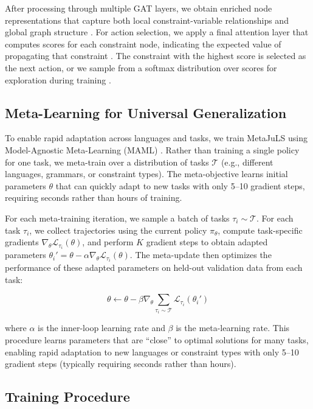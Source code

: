 \documentclass[11pt]{article}
\begin{document}
After processing through multiple GAT layers, we obtain enriched node representations that capture both local constraint-variable relationships and global graph structure \citep{hamilton2017inductive,perozzi2014deepwalk}. For action selection, we apply a final attention layer that computes scores for each constraint node, indicating the expected value of propagating that constraint \citep{vaswani2017attention}. The constraint with the highest score is selected as the next action, or we sample from a softmax distribution over scores for exploration during training \citep{schulman2017proximal}.

\subsection{Meta-Learning for Universal Generalization}

To enable rapid adaptation across languages and tasks, we train MetaJuLS using Model-Agnostic Meta-Learning (MAML) \citep{finn2017model}. Rather than training a single policy for one task, we meta-train over a distribution of tasks $\mathcal{T}$ (e.g., different languages, grammars, or constraint types). The meta-objective learns initial parameters $\theta$ that can quickly adapt to new tasks with only 5--10 gradient steps, requiring seconds rather than hours of training.

For each meta-training iteration, we sample a batch of tasks $\tau_i \sim \mathcal{T}$. For each task $\tau_i$, we collect trajectories using the current policy $\pi_\theta$, compute task-specific gradients $\nabla_{\theta} \mathcal{L}_{\tau_i}(\theta)$, and perform $K$ gradient steps to obtain adapted parameters $\theta_i' = \theta - \alpha \nabla_{\theta} \mathcal{L}_{\tau_i}(\theta)$. The meta-update then optimizes the performance of these adapted parameters on held-out validation data from each task:

\begin{equation}
\theta \leftarrow \theta - \beta \nabla_{\theta} \sum_{\tau_i \sim \mathcal{T}} \mathcal{L}_{\tau_i}(\theta_i')
\end{equation}

where $\alpha$ is the inner-loop learning rate and $\beta$ is the meta-learning rate. This procedure learns parameters that are ``close'' to optimal solutions for many tasks, enabling rapid adaptation to new languages or constraint types with only 5--10 gradient steps (typically requiring seconds rather than hours).

\subsection{Training Procedure}
\end{document}
